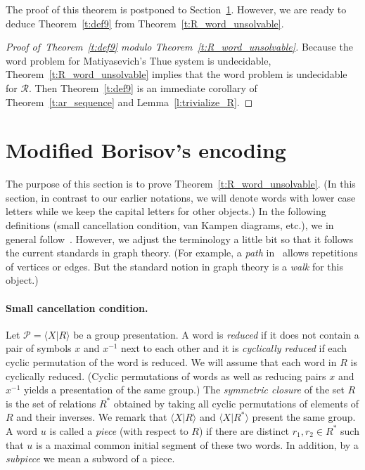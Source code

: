 \documentclass[10pt,a4paper]{article}
\theoremstyle{definition}
\theoremstyle{remark}
\newcommand\PP{\mathcal{P}}
\newcommand\RR{\mathcal{R}}
\begin{document}
The proof of this theorem is postponed to Section~\ref{s:new_encoding}.
However, we are ready to deduce Theorem~\ref{t:def9} from Theorem~\ref{t:R_word_unsolvable}.

\begin{proof}[Proof of~Theorem~\ref{t:def9} modulo Theorem~\ref{t:R_word_unsolvable}]
Because the word problem for Matiyasevich's Thue system is undecidable,
  Theorem~\ref{t:R_word_unsolvable} implies that the word problem is
  undecidable for $\RR$. Then Theorem~\ref{t:def9} is an immediate corollary of
  Theorem~\ref{t:ar_sequence} and Lemma~\ref{l:trivialize_R}.
\end{proof}


\section{Modified Borisov's encoding}
\label{s:new_encoding}
The purpose of this section is to prove
Theorem~\ref{t:R_word_unsolvable}. (In this section, in contrast to our
earlier notations, we will denote words with lower case letters while we keep
the capital letters for other objects.) In the following definitions (small
cancellation condition, van Kampen diagrams, etc.), we in general
follow~\cite{lyndon-schupp77}. However, we adjust the terminology a little bit
so that it follows the current standards in graph theory. (For example, a
\emph{path} in~\cite{lyndon-schupp77} allows repetitions of vertices or edges.
But the standard notion in graph theory is a \emph{walk} for this object.)


\paragraph{Small cancellation condition.}
Let $\PP = \langle X | R\rangle$ be a group presentation. A word is
\emph{reduced} if it does not contain a pair of symbols $x$ and $x^{-1}$ next
to each other and it is \emph{cyclically reduced} if each cyclic permutation of
the word is reduced. We will assume that each word in $R$ is cyclically
reduced. (Cyclic permutations of words as well as reducing pairs $x$ and
$x^{-1}$ yields a presentation of the same group.)
The \emph{symmetric closure} of the set $R$ is the set of relations $R^*$ obtained by taking all
cyclic permutations of elements of $R$ and their inverses. We remark that
$\langle X | R\rangle$ and $\langle X | R^*\rangle$ present the same group.
A word $u$ is called a \emph{piece} (with respect to $R$) if there
are distinct $r_1, r_2 \in R^*$ such that $u$ is a maximal common initial segment of
these two words. In addition, by a \emph{subpiece} we mean a subword of a
piece.
\end{document}
